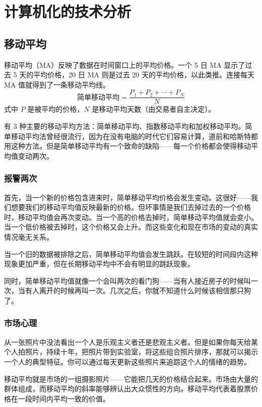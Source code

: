 \chapter{计算机化的技术分析}
\section{移动平均}
移动平均（MA）反映了数据在时间窗口上的平均价格。一个 5 日 MA 显示了过去 5 天的平均价格，20 日 MA 则是过去 20 天的平均价格，以此类推。连接每天 MA 值就得到了一条移动平均线。
\begin{equation}
    \textbf{简单移动平均}=\frac{P_1+P_2+\cdots+P_N}{N}
\end{equation}
式中 $P$ 是被平均的价格，$N$ 是移动平均天数（由交易者自主决定）。

有 3 种主要的移动平均方法：简单移动平均、指数移动平均和加权移动平均。简单移动平均法曾经很流行，因为在没有电脑的时代它们容易计算，道前和哈斯特都用这种方法。但是简单移动平均有一个致命的缺陷——每一个价格都会使得移动平均值变动两次。

\subsection*{报警两次}
\begin{tcolorbox}
    首先，当一个新的价格包含进来时，简单移动平均价格会发生变动。这很好——我们想要我们的移动平均值反映最新的价格。但坏事情是我们去掉过去的一个价格时，移动平均值会再次变动。当一个高的价格去掉时，简单移动平均值就会变小。当一个低价格被去掉时，这个价格又会上升。而这些变化和现在市场的变动的真实情况毫无关系。
\end{tcolorbox}

当一个旧的数据被排除之后，简单移动平均值会发生跳跃。在较短的时间段内这种现象更加严重，但在长期移动平均中不会有明显的跳跃现象。

同时，简单移动平均值就像一个会叫两次的看门狗——当有人接近房子的时候叫一次，当有人离开的时候再叫一次。几次之后，你就不知道什么时候该相信那只狗了。

\subsection*{市场心理}
从一张照片中没法看出一个人是乐观主义者还是悲观主义者。但是如果你每天给某个人拍照片，持续十年，把照片带到实验室，将这些组合照片排序，那就可以揭示一个人的典型特征。你可以通过每天更新这些照片来追踪这个人的情绪的趋势。

移动平均就是市场的一组摄影照片——它能把几天的价格结合起来。市场由大量的群体组成，而移动平均的斜率能够辨认出大众惯性的方向。移动平均代表着股票价格在一段时间内平均一致的价值。

